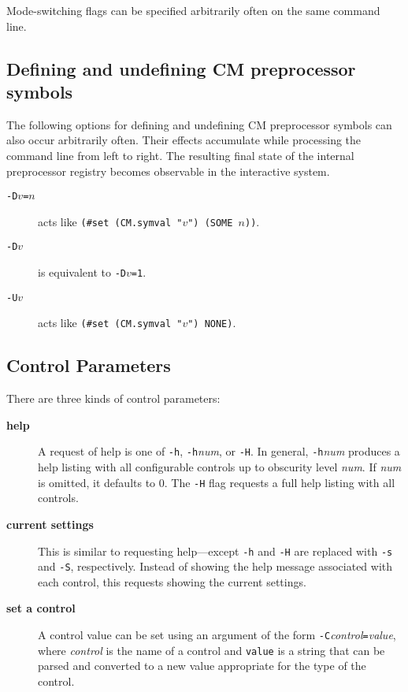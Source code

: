 Mode-switching flags can be specified arbitrarily often on the same
command line.

\subsection{Defining and undefining CM preprocessor symbols}
\label{sec:cmdline:defundef}

The following options for defining and undefining CM preprocessor
symbols can also occur arbitrarily often.  Their effects accumulate
while processing the command line from left to right.  The resulting
final state of the internal preprocessor registry becomes observable
in the interactive system.

\begin{description}
\item[{\tt -D$v$=$n$}] acts like {\tt (\#set (CM.symval "$v$") (SOME $n$))}.
\item[{\tt -D$v$}] is equivalent to {\tt -D$v$=1}.
\item[{\tt -U$v$}] acts like {\tt (\#set (CM.symval "$v$") NONE)}.
\end{description}

\subsection{Control Parameters}

There are three kinds of control parameters:

\begin{description}
\item[{\bf help}] A request of help is one of {\tt -h},
{\tt -h}{\it num}, or {\tt -H}.  In general, {\tt -h}{\it num}
produces a help listing with all configurable controls up to obscurity
level {\it num}.  If {\it num} is omitted, it defaults to 0.  The
{\tt -H} flag requests a full help listing with all controls.
\item[{\bf current settings}] This is similar to requesting
help---except {\tt -h} and {\tt -H} are replaced with {\tt -s} and
{\tt -S}, respectively.  Instead of showing the help message
associated with each control, this requests showing the current
settings.
\item[{\bf set a control}] A control value can be set using an
argument of the form {\tt -C}{\it control}{\tt =}{\it value}, where
{\it control} is the name of a control and {\tt value} is a string
that can be parsed and converted to a new value appropriate for the
type of the control.
\end{description}
